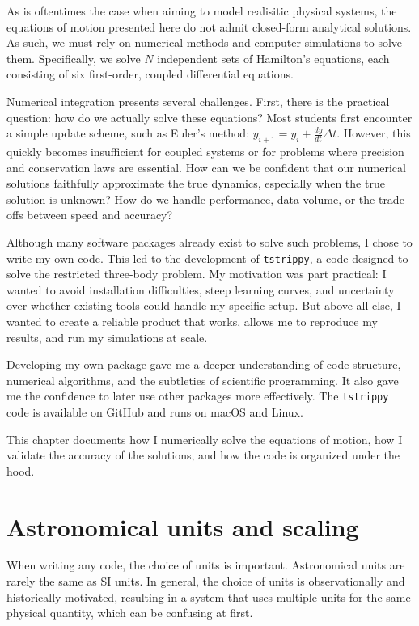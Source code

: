 As is oftentimes the case when aiming to model realisitic physical systems, the equations of motion presented here do not admit closed-form analytical solutions. As such, we must rely on numerical methods and computer simulations to solve them. Specifically, we solve $N$ independent sets of Hamilton's equations, each consisting of six first-order, coupled differential equations.

Numerical integration presents several challenges. First, there is the practical question: how do we actually solve these equations? Most students first encounter a simple update scheme, such as Euler's method: $y_{i+1} = y_i + \frac{dy}{dt}\Delta t$. However, this quickly becomes insufficient for coupled systems or for problems where precision and conservation laws are essential. How can we be confident that our numerical solutions faithfully approximate the true dynamics, especially when the true solution is unknown? How do we handle performance, data volume, or the trade-offs between speed and accuracy?

Although many software packages already exist to solve such problems, I chose to write my own code. This led to the development of \texttt{tstrippy}, a code designed to solve the restricted three-body problem. My motivation was part practical: I wanted to avoid installation difficulties, steep learning curves, and uncertainty over whether existing tools could handle my specific setup. But above all else, I wanted to create a reliable product that works, allows me to reproduce my results, and run my simulations at scale. 

Developing my own package gave me a deeper understanding of code structure, numerical algorithms, and the subtleties of scientific programming. It also gave me the confidence to later use other packages more effectively. The \texttt{tstrippy} code is available on GitHub and runs on macOS and Linux.

This chapter documents how I numerically solve the equations of motion, how I validate the accuracy of the solutions, and how the code is organized under the hood.



\section{Astronomical units and scaling}

    When writing any code, the choice of units is important. Astronomical units are rarely the same as SI units. In general, the choice of units is observationally and historically motivated, resulting in a system that uses multiple units for the same physical quantity, which can be confusing at first.


